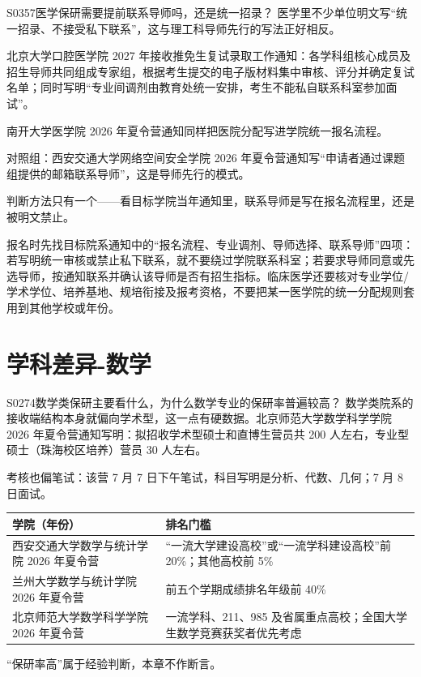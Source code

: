 \begin{qa}{S0357}{医学保研需要提前联系导师吗，还是统一招录？}
医学里不少单位明文写“统一招录、不接受私下联系”，这与理工科导师先行的写法正好相反。

北京大学口腔医学院 2027 年接收推免生复试录取工作通知：各学科组核心成员及招生导师共同组成专家组，根据考生提交的电子版材料集中审核、评分并确定复试名单；同时写明“专业间调剂由教育处统一安排，考生不能私自联系科室参加面试”。

南开大学医学院 2026 年夏令营通知同样把医院分配写进学院统一报名流程。

对照组：西安交通大学网络空间安全学院 2026 年夏令营通知写“申请者通过课题组提供的邮箱联系导师”，这是导师先行的模式。

判断方法只有一个——看目标学院当年通知里，联系导师是写在报名流程里，还是被明文禁止。

报名时先找目标院系通知中的“报名流程、专业调剂、导师选择、联系导师”四项：若写明统一审核或禁止私下联系，就不要绕过学院联系科室；若要求导师同意或先选导师，按通知联系并确认该导师是否有招生指标。临床医学还要核对专业学位/学术学位、培养基地、规培衔接及报考资格，不要把某一医学院的统一分配规则套用到其他学校或年份。
\end{qa}

\section{学科差异-数学}
\begin{qa}{S0274}{数学类保研主要看什么，为什么数学专业的保研率普遍较高？}
数学类院系的接收端结构本身就偏向学术型，这一点有硬数据。北京师范大学数学科学学院 2026 年夏令营通知写明：拟招收学术型硕士和直博生营员共 200 人左右，专业型硕士（珠海校区培养）营员 30 人左右。

考核也偏笔试：该营 7 月 7 日下午笔试，科目写明是分析、代数、几何；7 月 8 日面试。

\par\vspace{2pt}\nobreak\begin{center}\footnotesize
\begin{tabularx}{\textwidth}{>{\raggedright\arraybackslash}X>{\raggedright\arraybackslash}X}
\toprule
\textbf{学院（年份）} & \textbf{排名门槛} \\ \midrule
西安交通大学数学与统计学院 2026 年夏令营 & “一流大学建设高校”或“一流学科建设高校”前 20\%；其他高校前 5\% \\
兰州大学数学与统计学院 2026 年夏令营 & 前五个学期成绩排名年级前 40\% \\
北京师范大学数学科学学院 2026 年夏令营 & 一流学科、211、985 及省属重点高校；全国大学生数学竞赛获奖者优先考虑 \\
\bottomrule
\end{tabularx}
\end{center}\vspace{2pt}\par

“保研率高”属于经验判断，本章不作断言。
\end{qa}


